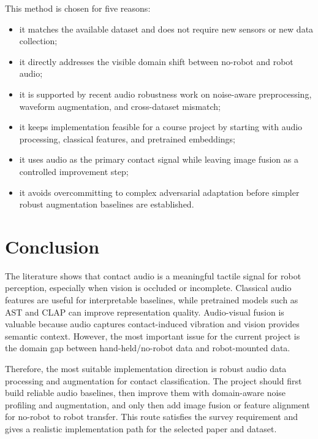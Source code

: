 \documentclass[12pt,a4paper]{article}
\begin{document}
This method is chosen for five reasons:

\begin{itemize}[leftmargin=1.5em]
\item it matches the available dataset and does not require new sensors or new data collection;
\item it directly addresses the visible domain shift between no-robot and robot audio;
\item it is supported by recent audio robustness work on noise-aware preprocessing, waveform augmentation, and cross-dataset mismatch;
\item it keeps implementation feasible for a course project by starting with audio processing, classical features, and pretrained embeddings;
\item it uses audio as the primary contact signal while leaving image fusion as a controlled improvement step;
\item it avoids overcommitting to complex adversarial adaptation before simpler robust augmentation baselines are established.
\end{itemize}

\section{Conclusion}

The literature shows that contact audio is a meaningful tactile signal for robot perception, especially when vision is occluded or incomplete. Classical audio features are useful for interpretable baselines, while pretrained models such as AST and CLAP can improve representation quality. Audio-visual fusion is valuable because audio captures contact-induced vibration and vision provides semantic context. However, the most important issue for the current project is the domain gap between hand-held/no-robot data and robot-mounted data.

Therefore, the most suitable implementation direction is robust audio data processing and augmentation for contact classification. The project should first build reliable audio baselines, then improve them with domain-aware noise profiling and augmentation, and only then add image fusion or feature alignment for no-robot to robot transfer. This route satisfies the survey requirement and gives a realistic implementation path for the selected paper and dataset.
\end{document}

